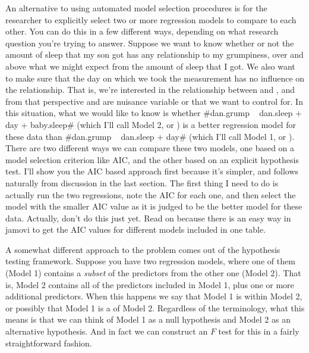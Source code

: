 
An alternative to using automated model selection procedures is for the researcher to explicitly select two or more regression models to compare to each other. You can do this in a few different ways, depending on what research question you're trying to answer. Suppose we want to know whether or not the amount of sleep that my son got has any relationship to my grumpiness, over and above what we might expect from the amount of sleep that I got. We also want to make sure that the day on which we took the measurement has no influence on the relationship. That is, we're interested in the relationship between  and , and from that perspective  and  are nuisance variable or  that we want to control for. In this situation, what we would like to know is whether \rtextverb#dan.grump ~ dan.sleep + day + baby.sleep# (which I'll call Model 2, or ) is a better regression model for these data than \rtextverb#dan.grump ~ dan.sleep + day# (which I'll call Model 1, or ). There are two different ways we can compare these two models, one based on a model selection criterion like AIC, and the other based on an explicit hypothesis test. I'll show you the AIC based approach first because it's simpler, and follows naturally from discussion in the last section. The first thing I need to do is actually run the two regressions, note the AIC for each one, and then select the model with the smaller AIC value as it is judged to be the better model for these data. Actually, don't do this just yet. Read on because there is an easy way in jamovi to get the AIC values for different models included in one table.

A somewhat different approach to the problem comes out of the hypothesis testing framework. Suppose you have two regression models, where one of them (Model 1) contains a {\it subset} of the predictors from the other one (Model 2). That is, Model 2 contains all of the predictors included in Model 1, plus one or more additional predictors. When this happens we say that Model 1 is  within Model 2, or possibly that Model 1 is a  of Model 2. Regardless of the terminology, what this means is that we can think of Model 1 as a null hypothesis and Model 2 as an alternative hypothesis. And in fact we can construct an $F$ test for this in a fairly straightforward fashion. 

